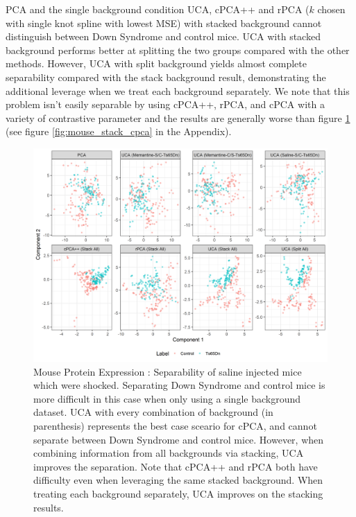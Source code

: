 \documentclass[12pt]{article}
\begin{document}
PCA and the single background condition UCA, cPCA++ and rPCA ($k$ chosen with single knot spline with lowest MSE) with stacked background cannot distinguish between Down Syndrome and control mice. UCA with stacked background performs better at splitting the two groups compared with the other methods.  However, UCA with split background yields almost complete separability compared with the stack background result, demonstrating the additional leverage when we treat each background separately.
We note that this problem isn't easily separable by using cPCA++, rPCA, and cPCA with a variety of contrastive parameter and the results are generally worse than figure \ref{fig:MouseSplitStack} (see figure \ref{fig:mouse_stack_cpca} in the Appendix). 


\begin{figure}[t]
    \centering
	\includegraphics[width = 1.0\textwidth]{figure/Mouse_split_stack_Ts65Dn.png}
	\caption{Mouse Protein Expression : Separability of saline injected mice which were shocked. Separating Down Syndrome and control mice is more difficult in this case when only using a single background dataset. UCA with every combination of background (in parenthesis) represents the best case sceario for cPCA, and cannot separate between Down Syndrome and control mice. However, when combining information from all backgrounds via stacking, UCA improves the separation. Note that cPCA++ and rPCA both have difficulty even when leveraging the same stacked background.  When treating each background separately, UCA improves on the stacking results.}
	    \label{fig:MouseSplitStack}
\end{figure}
\end{document}
